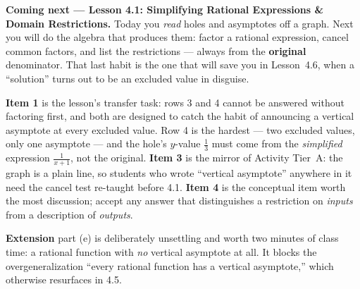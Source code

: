 \documentclass[10pt]{article}
\begin{document}
\begin{spiralbox}
\textbf{Coming next --- Lesson 4.1: Simplifying Rational Expressions \& Domain Restrictions.} Today
you \emph{read} holes and asymptotes off a graph. Next you will do the algebra that produces them:
factor a rational expression, cancel common factors, and list the restrictions --- always from the
\textbf{original} denominator. That last habit is the one that will save you in Lesson~4.6, when a
``solution'' turns out to be an excluded value in disguise.
\end{spiralbox}

\begin{teachernote}
\textbf{Item 1} is the lesson's transfer task: rows 3 and 4 cannot be answered without factoring
first, and both are designed to catch the habit of announcing a vertical asymptote at every excluded
value. Row 4 is the hardest --- two excluded values, only one asymptote --- and the hole's $y$-value
$\tfrac13$ must come from the \emph{simplified} expression $\frac{1}{x+1}$, not the original.
\textbf{Item 3} is the mirror of Activity Tier~A: the graph is a plain line, so students who wrote
``vertical asymptote'' anywhere in it need the cancel test re-taught before 4.1. \textbf{Item 4} is
the conceptual item worth the most discussion; accept any answer that distinguishes a restriction on
\emph{inputs} from a description of \emph{outputs}.

\textbf{Extension} part (e) is deliberately unsettling and worth two minutes of class time: a rational
function with \emph{no} vertical asymptote at all. It blocks the overgeneralization ``every rational
function has a vertical asymptote,'' which otherwise resurfaces in 4.5.
\end{teachernote}
\end{document}
